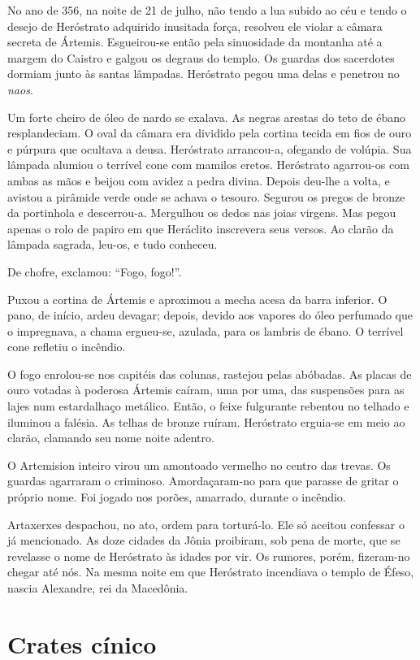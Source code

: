 No ano de 356, na noite de 21 de julho, não tendo a lua subido ao céu e
tendo o desejo de Heróstrato adquirido inusitada força, resolveu ele
violar a câmara secreta de Ártemis. Esgueirou-se então pela sinuosidade da
montanha até a margem do Caistro e galgou os degraus do templo. Os guardas
dos sacerdotes dormiam junto às santas lâmpadas. Heróstrato pegou uma
delas e penetrou no \textit{naos}.

Um forte cheiro de óleo de nardo se exalava. As negras arestas do teto de
ébano resplandeciam. O oval da câmara era dividido pela cortina tecida em
fios de ouro e púrpura que ocultava a deusa. Heróstrato arrancou-a,
ofegando de volúpia. Sua lâmpada alumiou o terrível cone com mamilos
eretos. Heróstrato agarrou-os com ambas as mãos e beijou com avidez a
pedra divina. Depois deu-lhe a volta, e avistou a pirâmide verde onde se
achava o tesouro. Segurou os pregos de bronze da portinhola e descerrou-a.
Mergulhou os dedos nas joias virgens. Mas pegou apenas o rolo de papiro em
que Heráclito inscrevera seus versos. Ao clarão da lâmpada sagrada,
leu-os, e tudo conheceu.

De chofre, exclamou: “Fogo, fogo!”.

Puxou a cortina de Ártemis e aproximou a mecha acesa da barra inferior. O
pano, de início, ardeu devagar; depois, devido aos vapores do óleo
perfumado que o impregnava, a chama ergueu-se, azulada, para os lambris de
ébano. O terrível cone refletiu o incêndio.

O fogo enrolou-se nos capitéis das colunas, rastejou pelas abóbadas. As
placas de ouro votadas à poderosa Ártemis caíram, uma por uma, das
suspensões para as lajes num estardalhaço metálico. Então, o feixe
fulgurante rebentou no telhado e iluminou a falésia. As telhas de bronze
ruíram. Heróstrato erguia-se em meio ao clarão, clamando seu nome noite
adentro.

O Artemision inteiro virou um amontoado vermelho no centro das trevas. Os
guardas agarraram o criminoso. Amordaçaram-no para que parasse de gritar o
próprio nome. Foi jogado nos porões, amarrado, durante o incêndio.

Artaxerxes despachou, no ato, ordem para torturá-lo. Ele só aceitou
confessar o já mencionado. As doze cidades da Jônia proibiram, sob pena de
morte, que se revelasse o nome de Heróstrato às idades por vir. Os
rumores, porém, fizeram-no chegar até nós. Na mesma noite em que
Heróstrato incendiava o templo de Éfeso, nascia Alexandre, rei da
Macedônia.

\chapter{Crates cínico}


